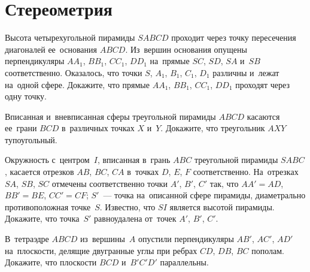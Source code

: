 
\section*{Стереометрия}


\begin{problems}


\item
Высота четырехугольной пирамиды $SABCD$ проходит через точку пересечения
диагоналей ее~основания $ABCD$.
Из~вершин основания опущены перпендикуляры $A A_1$, $B B_1$, $C C_1$, $D D_1$
на~прямые $SC$, $SD$, $SA$ и~$SB$ соответственно.
Оказалось, что точки $S$, $A_1$, $B_1$, $C_1$, $D_1$ различны и~лежат на~одной
сфере.
Докажите, что прямые $A A_1$, $B B_1$, $C C_1$, $D D_1$ проходят через одну
точку.

\item
Вписанная и~вневписанная сферы треугольной пирамиды $ABCD$ касаются ее~грани
$BCD$ в~различных точках $X$ и~$Y$.
Докажите, что треугольник $AXY$ тупоугольный.

\item
Окружность с~центром~$I$, вписанная в~грань $ABC$ треугольной пирамиды $SABC$,
касается отрезков $AB$, $BC$, $CA$ в~точках $D$, $E$, $F$ соответственно.
На~отрезках $SA$, $SB$, $SC$ отмечены соответственно точки $A'$, $B'$, $C'$
так, что $AA' = AD$, $BB' = BE$, $CC' = CF$;
$S'$~— точка на~описанной сфере пирамиды, диаметрально противоположная
точке~$S$.
Известно, что $SI$ является высотой пирамиды.
Докажите, что точка~$S'$ равноудалена от~точек $A'$, $B'$, $C'$.


\item
В~тетраэдре $ABCD$ из~вершины~$A$ опустили перпендикуляры $AB'$, $AC'$, $AD'$
на~плоскости, делящие двугранные углы при ребрах $CD$, $DB$, $BC$ пополам.
Докажите, что плоскости $BCD$ и~$B'C'D'$ параллельны.


\end{problems}
